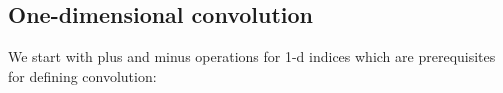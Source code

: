 \subsection{One-dimensional convolution}
We start with plus and minus operations for 1-d indices which are
prerequisites for defining convolution:
\begin{code}[hide]%
%
\>[2]\AgdaSpace{}%
\AgdaSymbol{:}\AgdaSpace{}%
\AgdaSpace{}%
\AgdaSymbol{(}\AgdaSpace{}%
\AgdaSymbol{)}\AgdaSpace{}%
\AgdaSpace{}%
\AgdaSpace{}%
\AgdaSymbol{(}\AgdaSpace{}%
\AgdaSymbol{(}\AgdaSpace{}%
\AgdaOperator{\AgdaPrimitive{+}}\AgdaSpace{}%
\AgdaSymbol{))}\<%
\\
%
\>[2]\AgdaSpace{}%
\AgdaSymbol{\{}\AgdaSymbol{\}}\AgdaSpace{}%
\AgdaSymbol{\{}\AgdaSymbol{\}}\AgdaSpace{}%
\AgdaSpace{}%
\AgdaSpace{}%
\AgdaSpace{}%
\AgdaSpace{}%
%
\>[44]\AgdaSymbol{=}\AgdaSpace{}%
\AgdaSpace{}%
\AgdaSymbol{\AgdaUnderscore{}}\AgdaSpace{}%
\<%
\\
\>[0]\<%
\\
%
\>[2]\AgdaSpace{}%
\AgdaSymbol{:}\AgdaSpace{}%
\AgdaSymbol{(}\AgdaSpace{}%
\AgdaSymbol{:}\AgdaSpace{}%
\AgdaSpace{}%
\AgdaSymbol{(}\AgdaSpace{}%
\AgdaOperator{\AgdaPrimitive{+}}\AgdaSpace{}%
\AgdaSymbol{))}\AgdaSpace{}%
\AgdaSymbol{(}\AgdaSpace{}%
\AgdaSymbol{:}\AgdaSpace{}%
\AgdaSpace{}%
\AgdaSymbol{)}\AgdaSpace{}%
\AgdaSpace{}%
\AgdaSpace{}%
\AgdaSpace{}%
\AgdaSpace{}%
\AgdaSpace{}%
\AgdaSpace{}%
\AgdaSpace{}%
\AgdaSpace{}%
\AgdaSpace{}%
\AgdaSymbol{\AgdaUnderscore{}}\AgdaSpace{}%
\AgdaSpace{}%
\AgdaSpace{}%
\<%
\\
%
\>[2]\AgdaSpace{}%
\AgdaSymbol{\{}\AgdaSpace{}%
\AgdaSymbol{\}}\AgdaSpace{}%
\AgdaSpace{}%
\AgdaSpace{}%

\end{code}
